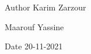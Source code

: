 \begin{DoxyAuthor}{Author}
Karim Zarzour 

Maarouf Yassine 
\end{DoxyAuthor}
\begin{DoxyDate}{Date}
20-\/11-\/2021 
\end{DoxyDate}
